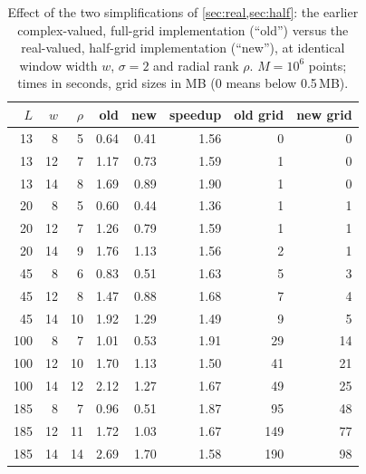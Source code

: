 \begin{table}[!htbp]\centering\small
\caption{Effect of the two simplifications of \cref{sec:real,sec:half}: the earlier complex-valued, full-grid implementation (``old'')
versus the real-valued, half-grid implementation (``new''), at identical window width $w$, $\sigma=2$ and radial rank $\rho$.
$M=10^6$ points; times in seconds, grid sizes in MB (0 means below 0.5\,MB).}\label{tab:oldnew}
\begin{tabular}{rrr rrr rr}\toprule
$L$&$w$&$\rho$&old&new&speedup&old grid&new grid\\\midrule
13 & 8 & 5 & 0.64 & 0.41 & 1.56 & 0 & 0\\
13 & 12 & 7 & 1.17 & 0.73 & 1.59 & 1 & 0\\
13 & 14 & 8 & 1.69 & 0.89 & 1.90 & 1 & 0\\
20 & 8 & 5 & 0.60 & 0.44 & 1.36 & 1 & 1\\
20 & 12 & 7 & 1.26 & 0.79 & 1.59 & 1 & 1\\
20 & 14 & 9 & 1.76 & 1.13 & 1.56 & 2 & 1\\
45 & 8 & 6 & 0.83 & 0.51 & 1.63 & 5 & 3\\
45 & 12 & 8 & 1.47 & 0.88 & 1.68 & 7 & 4\\
45 & 14 & 10 & 1.92 & 1.29 & 1.49 & 9 & 5\\
100 & 8 & 7 & 1.01 & 0.53 & 1.91 & 29 & 14\\
100 & 12 & 10 & 1.70 & 1.13 & 1.50 & 41 & 21\\
100 & 14 & 12 & 2.12 & 1.27 & 1.67 & 49 & 25\\
185 & 8 & 7 & 0.96 & 0.51 & 1.87 & 95 & 48\\
185 & 12 & 11 & 1.72 & 1.03 & 1.67 & 149 & 77\\
185 & 14 & 14 & 2.69 & 1.70 & 1.58 & 190 & 98\\
\bottomrule\end{tabular}\end{table}
